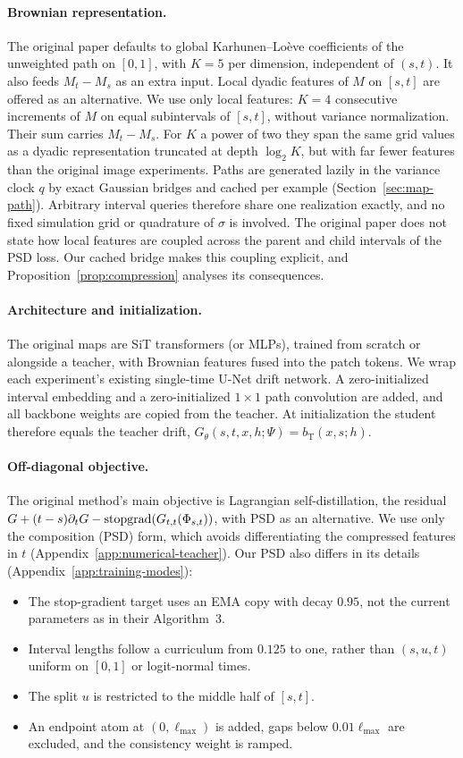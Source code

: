 \paragraph{Brownian representation.} The original paper defaults to global Karhunen--Lo\`eve coefficients of the unweighted path on $[0,1]$, with $K=5$ per dimension, independent of $(s,t)$. It also feeds $M_t-M_s$ as an extra input. Local dyadic features of $M$ on $[s,t]$ are offered as an alternative. We use only local features: $K=4$ consecutive increments of $M$ on equal subintervals of $[s,t]$, without variance normalization. Their sum carries $M_t-M_s$. For $K$ a power of two they span the same grid values as a dyadic representation truncated at depth $\log_2K$, but with far fewer features than the original image experiments. Paths are generated lazily in the variance clock $q$ by exact Gaussian bridges and cached per example (Section~\ref{sec:map-path}). Arbitrary interval queries therefore share one realization exactly, and no fixed simulation grid or quadrature of $\sigma$ is involved. The original paper does not state how local features are coupled across the parent and child intervals of the PSD loss. Our cached bridge makes this coupling explicit, and Proposition~\ref{prop:compression} analyses its consequences.

\paragraph{Architecture and initialization.} The original maps are SiT transformers (or MLPs), trained from scratch or alongside a teacher, with Brownian features fused into the patch tokens. We wrap each experiment's existing single-time U-Net drift network. A zero-initialized interval embedding and a zero-initialized $1\times1$ path convolution are added, and all backbone weights are copied from the teacher. At initialization the student therefore equals the teacher drift, $G_\theta(s,t,x,h;\Psi)=b_{\mathrm T}(x,s;h)$.

\paragraph{Off-diagonal objective.} The original method's main objective is Lagrangian self-distillation, the residual $G+(t-s)\partial_tG-\operatorname{stopgrad}(G_{t,t}(\Phi_{s,t}))$, with PSD as an alternative. We use only the composition (PSD) form, which avoids differentiating the compressed features in $t$ (Appendix~\ref{app:numerical-teacher}). Our PSD also differs in its details (Appendix~\ref{app:training-modes}):
\begin{itemize}
\item The stop-gradient target uses an EMA copy with decay $0.95$, not the current parameters as in their Algorithm~3.
\item Interval lengths follow a curriculum from $0.125$ to one, rather than $(s,u,t)$ uniform on $[0,1]$ or logit-normal times.
\item The split $u$ is restricted to the middle half of $[s,t]$.
\item An endpoint atom at $(0,\ell_{\max})$ is added, gaps below $0.01\ell_{\max}$ are excluded, and the consistency weight is ramped.
\end{itemize}

